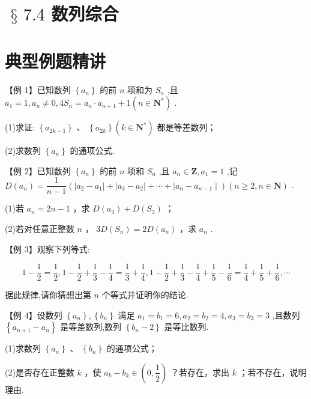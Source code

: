 \section*{$\text{ § }{7.4}$ 数列综合}

\section*{典型例题精讲}

【例 1】已知数列 $\left\{  {a}_{n}\right\}$ 的前 $n$ 项和为 ${S}_{n}$ ,且 ${a}_{1} = 1,{a}_{n} \neq  0,4{S}_{n} = {a}_{n} \cdot  {a}_{n + 1} + 1\left( {n \in  {\mathbf{N}}^{ * }}\right)$ .

(1)求证: $\left\{  {a}_{{2k} - 1}\right\}$ 、 $\left\{  {a}_{2k}\right\}  \left( {k \in  {\mathbf{N}}^{ * }}\right)$ 都是等差数列；

(2)求数列 $\left\{  {a}_{n}\right\}$ 的通项公式.

【例 2】已知数列 $\left\{  {a}_{n}\right\}$ 的前 $n$ 项和 ${S}_{n}$ ,且 ${a}_{n} \in  \mathbf{Z},{a}_{1} = 1$ ,记 $D\left( {a}_{n}\right)  = \dfrac{1}{n - 1}\left( {\left| {{a}_{2} - {a}_{1}}\right|  + \left| {{a}_{3} - {a}_{2}}\right|  + \cdots  + }\right.  \left. {\mid {a}_{n} - {a}_{n - 1} \mid  }\right) \left( {n \geq  2,n \in  \mathbf{N}}\right)$ .

(1)若 ${a}_{n} = {2n} - 1$ ，求 $D\left( {a}_{3}\right)  + D\left( {S}_{3}\right)$ ；

(2)若对任意正整数 $n$ ， ${3D}\left( {S}_{n}\right)  = {2D}\left( {a}_{n}\right)$ ，求 ${a}_{n}$ .

【例 3】观察下列等式:

\[
1 - \dfrac{1}{2} = \dfrac{1}{2},1 - \dfrac{1}{2} + \dfrac{1}{3} - \dfrac{1}{4} = \dfrac{1}{3} + \dfrac{1}{4},1 - \dfrac{1}{2} + \dfrac{1}{3} - \dfrac{1}{4} + \dfrac{1}{5} - \dfrac{1}{6} = \dfrac{1}{4} + \dfrac{1}{5} + \dfrac{1}{6},\cdots
\]

据此规律,请你猜想出第 $n$ 个等式并证明你的结论.

【例 4】设数列 $\left\{  {a}_{n}\right\}  ,\left\{  {b}_{n}\right\}$ 满足 ${a}_{1} = {b}_{1} = 6,{a}_{2} = {b}_{2} = 4,{a}_{3} = {b}_{3} = 3$ ,且数列 $\left\{  {{a}_{n + 1} - {a}_{n}}\right\}$ 是等差数列,数列 $\left\{  {{b}_{n} - 2}\right\}$ 是等比数列.

(1)求数列 $\left\{  {a}_{n}\right\}$ 、 $\left\{  {b}_{n}\right\}$ 的通项公式；

(2)是否存在正整数 $k$ ，使 ${a}_{k} - {b}_{k} \in  \left( {0,\dfrac{1}{2}}\right)$ ？若存在，求出 $k$ ；若不存在，说明理由.

